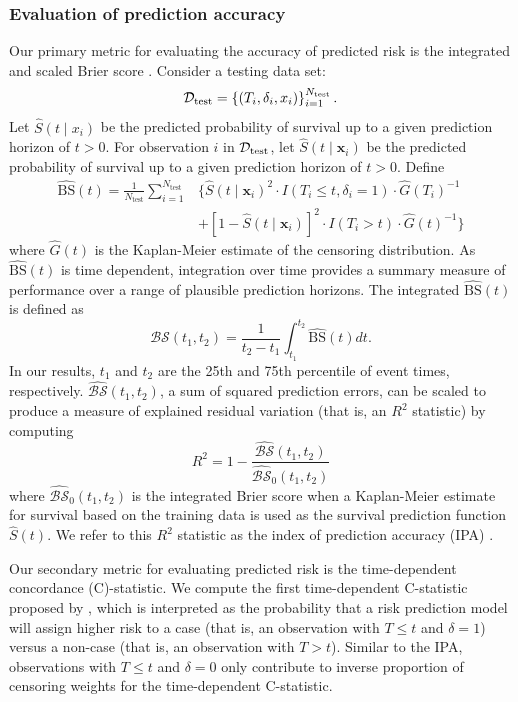 \documentclass[twoside,11pt]{article}\usepackage[]{graphicx}\usepackage[]{xcolor}
\newcommand{\dataset}{{\cal D}}
\newcommand{\ie}{that is}
\newcommand{\bstat}{\widehat{\text{BS}}(t)}
\newcommand{\bsbar}{\mathcal{\widehat{BS}}(t_1, t_2)}
\newcommand{\bskap}{\mathcal{\widehat{BS}}_0(t_1, t_2)}
\newcommand{\ntest}{N_{\text{test}}}
\begin{document}
\restoregeometry



\subsubsection{Evaluation of prediction accuracy} \label{sec:prediction_accuracy}

Our primary metric for evaluating the accuracy of predicted risk is the integrated and scaled Brier score \citep{graf1999assessment}. Consider a testing data set:
$$\dataset_{\text{test}} = \left\{ (T_i, \delta_i, x_{i}) \right\}_{i=1}^{N_{\text{test}}}.$$
Let $\widehat{S}(t \mid x_i)$ be the predicted probability of survival up to a given prediction horizon of $t > 0$.
 For observation $i$ in $\dataset_{\text{test}}$, let $\widehat{S}(t \mid \bm{x}_i)$ be the predicted probability of survival up to a given prediction horizon of $t > 0$. Define \begin{align*}
\bstat = \frac{1}{\ntest} \sum_{i=1}^{\ntest} &\{ \widehat{S}(t \mid \bm{x}_i)^2 \cdot I(T_i \leq t, \delta_i = 1) \cdot \widehat{G}(T_i)^{-1} \\ &+ [1-\widehat{S}(t \mid \bm{x}_i)]^2 \cdot I(T_i > t) \cdot \widehat{G}(t)^{-1}\}
\end{align*} where $\widehat{G}(t)$ is the Kaplan-Meier estimate of the censoring distribution. As $\bstat$ is time dependent, integration over time provides a summary measure of performance over a range of plausible prediction horizons. The integrated $\bstat$ is defined as \begin{equation}
\bsbar = \frac{1}{t_2 - t_1}\int_{t_1}^{t_2} \widehat{\text{BS}}(t) dt.
\end{equation} In our results, $t_1$ and $t_2$ are the 25th and 75th percentile of event times, respectively. $\bsbar$, a sum of squared prediction errors, can be scaled to produce a measure of explained residual variation (\ie, an $R^2$ statistic) by computing \begin{equation}
R^2 = 1 - \frac{\bsbar}{\bskap}
\end{equation} where $\bskap$ is the integrated Brier score when a Kaplan-Meier estimate for survival based on the training data is used as the survival prediction function $\widehat{S}(t)$. We refer to this $R^2$ statistic as the index of prediction accuracy (IPA) \citep{kattan2018index}.

Our secondary metric for evaluating predicted risk is the time-dependent concordance (C)-statistic. We compute the first time-dependent C-statistic proposed by \citet[][Equation~3]{blanche2013estimating}, which is interpreted as the probability that a risk prediction model will assign higher risk to a case (\ie, an observation with $T \leq t$ and $\delta = 1$) versus a non-case (\ie, an observation with $T > t$). Similar to the IPA, observations with $T \leq t$ and $\delta = 0$ only contribute to inverse proportion of censoring weights for the time-dependent C-statistic.
\end{document}
